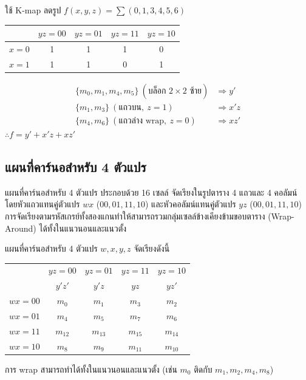\begin{ex}
\label{ex:kmap-3var}
ใช้ K-map ลดรูป $f(x, y, z) = \sum(0, 1, 3, 4, 5, 6)$

\begin{center}
\begin{tabular}{|c|c|c|c|c|}
\hline
 & $yz = 00$ & $yz = 01$ & $yz = 11$ & $yz = 10$ \\
\hline
$x = 0$ & 1 & 1 & 1 & 0 \\
\hline
$x = 1$ & 1 & 1 & 0 & 1 \\
\hline
\end{tabular}
\end{center}
\end{ex}
\begin{solution}
\begin{align*}
\{m_0, m_1, m_4, m_5\}\ (\text{บล็อก } 2\times 2 \text{ ซ้าย}) &\Rightarrow y'\\
\{m_1, m_3\}\ (\text{แถวบน},\ z = 1) &\Rightarrow x'z\\
\{m_4, m_6\}\ (\text{แถวล่าง wrap},\ z = 0) &\Rightarrow xz'
\end{align*}
$\therefore f = y' + x'z + xz'$ \solhere
\end{solution}

\subsection{แผนที่คาร์นอสำหรับ 4 ตัวแปร}
แผนที่คาร์นอสำหรับ 4 ตัวแปร ประกอบด้วย 16 เซลล์ จัดเรียงในรูปตาราง 4 แถวและ 4 คอลัมน์ โดยหัวแถวแทนคู่ตัวแปร $wx$ ($00, 01, 11, 10$) และหัวคอลัมน์แทนคู่ตัวแปร $yz$ ($00, 01, 11, 10$) การจัดเรียงตามรหัสเกรย์ทั้งสองแกนทำให้สามารถรวมกลุ่มเซลล์ข้างเคียงข้ามขอบตาราง (Wrap-Around) ได้ทั้งในแนวนอนและแนวตั้ง~\parencite{kolman2008discrete}

\begin{principle}
แผนที่คาร์นอสำหรับ 4 ตัวแปร $w, x, y, z$ จัดเรียงดังนี้

\begin{center}
\begin{tabular}{|c|c|c|c|c|}
\hline
 & $yz = 00$ & $yz = 01$ & $yz = 11$ & $yz = 10$ \\
 & $y'z'$ & $y'z$ & $yz$ & $yz'$ \\
\hline
$wx = 00$ & $m_0$ & $m_1$ & $m_3$ & $m_2$ \\
\hline
$wx = 01$ & $m_4$ & $m_5$ & $m_7$ & $m_6$ \\
\hline
$wx = 11$ & $m_{12}$ & $m_{13}$ & $m_{15}$ & $m_{14}$ \\
\hline
$wx = 10$ & $m_8$ & $m_9$ & $m_{11}$ & $m_{10}$ \\
\hline
\end{tabular}
\end{center}

การ wrap สามารถทำได้ทั้งในแนวนอนและแนวตั้ง (เช่น $m_0$ ติดกับ $m_1, m_2, m_4, m_8$)
\end{principle}

